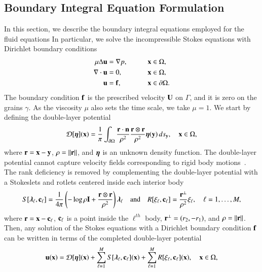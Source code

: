\documentclass[preprint, 10pt]{elsarticle}
\begin{document}
\subsection{Boundary Integral Equation Formulation} 
\label{sec:bies}

In this section, we describe the boundary integral equations employed for the fluid
equations \cite{Moore2007}
In particular, we solve the incompressible Stokes equations
with Dirichlet boundary conditions 
\begin{alignat*}{3}
  \mu\Delta {\mathbf{u}} &= {\nabla} p, \qquad && {\mathbf{x}} \in \Omega, \\
  {\nabla} \cdot {\mathbf{u}} &= 0,   && {\mathbf{x}} \in \Omega, \\
  {\mathbf{u}} &= {\mathbf{f}},  && {\mathbf{x}} \in {\partial}\Omega.
\end{alignat*}
The boundary condition ${\mathbf{f}}$ is the prescribed velocity ${\mathbf{U}}$ on
$\Gamma$, and it is zero on the grains $\gamma$.  As the viscosity $\mu$
also sets the time scale, we take $\mu=1$.  We start by defining the
double-layer potential
\begin{align}
  {\mathcal{D}}[{\boldsymbol\eta}]({\mathbf{x}}) = \frac{1}{\pi} \int_{{\partial}\Omega} 
    \frac{{\mathbf{r}} \cdot {\mathbf{n}}}{\rho^2} \frac{{\mathbf{r}} \otimes {\mathbf{r}}}{\rho^2} 
    {\boldsymbol\eta}({\mathbf{y}}) \, ds_{\mathbf{y}}, \quad {\mathbf{x}} \in \Omega,
    \label{eqn:velocityDLP}
\end{align}
where ${\mathbf{r}} = {\mathbf{x}} - {\mathbf{y}}$, $\rho = \|{\mathbf{r}}\|$, and ${\boldsymbol\eta}$ is an unknown density function.  The
double-layer potential cannot capture velocity fields corresponding to
rigid body motions~\cite{pow-mir1987}.  The rank deficiency is removed
by complementing the double-layer potential with a Stokeslets and
rotlets centered inside each interior body
\begin{align}
  S[{\boldsymbol\lambda}_\ell,{\mathbf{c}}_\ell] = \frac{1}{4\pi} \left(-\log \rho {\mathbf{I}} + 
    \frac{{\mathbf{r}} \otimes {\mathbf{r}}}{\rho^2} \right){\boldsymbol\lambda}_\ell
  \quad \text{and} \quad
  R[\xi_\ell,{\mathbf{c}}_\ell] = \frac{{\mathbf{r}}^\perp}{\rho^2}\xi_\ell, 
  \quad \ell=1,\ldots,M,
  \label{eqn:stokeslet_rotlet}
\end{align}
where  ${\mathbf{r}} = {\mathbf{x}} - {\mathbf{c}}_\ell$, ${\mathbf{c}}_\ell$ is a point inside the
$\ell^{th}$ body, ${\mathbf{r}}^\perp = (r_2,-r_1)$, and $\rho = \|{\mathbf{r}}\|$.  Then,
any solution of the Stokes equations with a Dirichlet boundary condition
${\mathbf{f}}$ can be written in terms of the completed double-layer potential
\begin{align}
  \label{eqn:completed_DLP}
  {\mathbf{u}}({\mathbf{x}}) = {\mathcal{D}}[{\boldsymbol\eta}]({\mathbf{x}}) + 
    \sum_{\ell=1}^{M} S[{\boldsymbol\lambda}_\ell,{\mathbf{c}}_\ell]({\mathbf{x}}) +
    \sum_{\ell=1}^{M} R[\xi_\ell,{\mathbf{c}}_\ell]({\mathbf{x}}), \quad {\mathbf{x}} \in \Omega,
\end{align}
\end{document}
